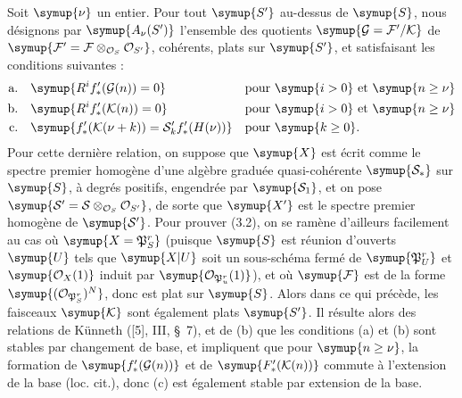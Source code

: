 Soit $\symup{\nu}$ un entier. Pour tout $\symup{S'}$ au-dessus de $\symup{S}$, nous désignons par
$\symup{A_\nu(S')}$ l'ensemble des quotients
$\symup{\mathcal G=\mathcal F'/\mathcal K}$ de
$\symup{\mathcal F'=\mathcal F\otimes_{\mathcal O_S}\mathcal O_{S'}}$, cohérents,
plats sur $\symup{S'}$, et satisfaisant les conditions suivantes :
\begin{align*}
\text{a.}\quad &\symup{R^if^\prime_*(\mathcal G(n))=0} &&\text{pour $\symup{i>0}$ et $\symup{n\geq\nu}$}\\
\text{b.}\quad &\symup{R^if^\prime_*(\mathcal K(n))=0} &&\text{pour $\symup{i>0}$ et $\symup{n\geq\nu}$}\\
\text{c.}\quad &\symup{f^\prime_*(\mathcal K(\nu+k))=\mathcal S^\prime_k f^\prime_*(H(\nu))} &&\text{pour $\symup{k\geq0}$}.
\end{align*}
Pour cette dernière relation, on suppose que $\symup{X}$ est écrit comme le spectre
premier homogène d'une algèbre graduée quasi-cohérente $\symup{\mathcal S_*}$ sur $\symup{S}$,
à degrés positifs, engendrée par $\symup{\mathcal S_1}$, et on pose
$\symup{\mathcal S' =\mathcal S\otimes_{\mathcal O_S}\mathcal O_{S'}}$, de sorte
que $\symup{X'}$ est le spectre premier homogène de $\symup{\mathcal S'}$. Pour prouver
(3.2), on se ramène d'ailleurs facilement au cas où $\symup{X=\mathfrak P^r_S}$ (puisque
$\symup{S}$ est réunion d'ouverts $\symup{U}$ tels que $\symup{X|U}$ soit un sous-schéma fermé de
$\symup{\mathfrak P^r_U}$ et $\symup{\mathcal O_X(1)}$ induit par
$\symup{\mathcal O_{\mathfrak P^r_u}(1)}$), et où $\symup{\mathcal F}$ est de la forme
$\symup{(\mathcal O_{\mathfrak P^r_S})^{N}}$, donc est plat sur $\symup{S}$. Alors dans ce qui
précède, les faisceaux $\symup{\mathcal K}$ sont également plats $\symup{S'}$. Il résulte
alors des relations de Künneth ([5], III, \S~7), et de (b) que les conditions (a) et (b)
sont stables par changement de base, et impliquent que pour $\symup{n\geq\nu}$, la
formation de $\symup{f'_*(\mathcal G(n))}$ et de $\symup{F'_*(\mathcal K(n))}$ commute à
l'extension de la base (loc. cit.), donc (c) est également stable par extension
de la base.

